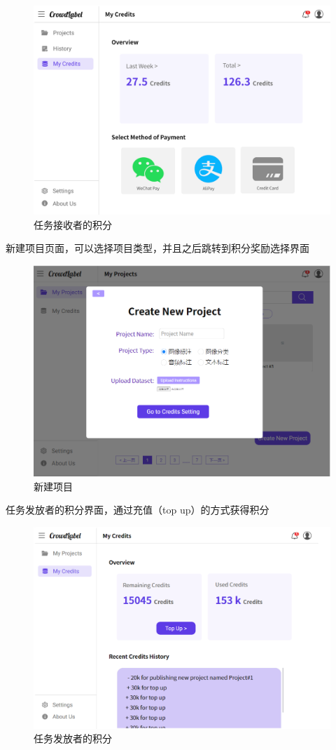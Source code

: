\begin{figure}[h!]
    \centering
    \includegraphics[width=\linewidth]{imgs/prototype/credits.png}
    \caption{任务接收者的积分}
\end{figure}

\newpage

新建项目页面，可以选择项目类型，并且之后跳转到积分奖励选择界面

\begin{figure}[h!]
    \centering
    \includegraphics[width=\linewidth]{imgs/prototype/newproject.png}
    \caption{新建项目}
\end{figure}

\newpage

任务发放者的积分界面，通过充值（top up）的方式获得积分

\begin{figure}[h!]
    \centering
    \includegraphics[width=\linewidth]{imgs/prototype/sendercredits.png}
    \caption{任务发放者的积分}
\end{figure}